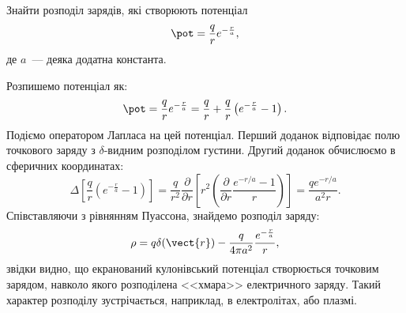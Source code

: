 \begin{problem}
Знайти розподіл зарядів, які створюють  потенціал
\[
	\pot = \frac{q}{r}e^{-\frac{r}{a}},
\]
де $a$~--- деяка додатна константа.
\begin{solution}
	Розпишемо потенціал як: 
    \[
	\pot = \frac{q}{r}e^{-\frac{r}{a}} = \frac{q}{r} +  \frac{q}{r}\left(e^{-\frac{r}{a}} - 1\right) .
    \]
    Подіємо оператором Лапласа на цей потенціал. Перший доданок відповідає полю точкового заряду з  $\delta$-видним розподілом густини. Другий доданок обчислюємо в сферичних координатах:
    \[
        \Delta \left[\frac{q}{r}\left(e^{-\frac{r}{a}} - 1\right) \right] =
    \frac{q}{r^2}\frac{\partial}{\partial r}\left[ r^2\left( \frac{\partial }{\partial r}\frac{e^{-r/a} - 1}{r} \right) \right] = \frac{qe^{-r/a}}{a^2r}.
    \]
	Співставляючи з рівнянням Пуассона, знайдемо розподіл заряду:
	\[
		\rho = q\delta(\vect{r}) - \frac{q}{4\pi a^2} \frac{e^{-\frac{r}{a}}}{r},
	\]
	звідки видно, що екранований кулонівський потенціал створюється точковим зарядом, навколо якого розподілена <<хмара>> електричного заряду. Такий характер розподілу зустрічається, наприклад, в електролітах, або плазмі.
\end{solution}
\end{problem}


